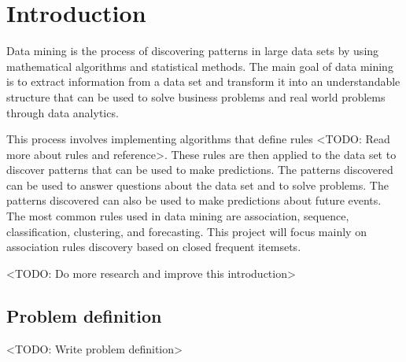 \chapter{Introduction}
\label{chap:thesis-introduction}

Data mining is the process of discovering patterns in large data sets by using mathematical algorithms and statistical methods. The main goal of data mining is to extract information from a data set and transform it into an understandable structure that can be used to solve business problems and real world problems through data analytics.

This process involves implementing algorithms that define rules <TODO: Read more about rules and reference>. These rules are then applied to the data set to discover patterns that can be used to make predictions. The patterns discovered can be used to answer questions about the data set and to solve problems. The patterns discovered can also be used to make predictions about future events. The most common rules used in data mining are association, sequence, classification, clustering, and forecasting. This project will focus mainly on association rules discovery based on closed frequent itemsets.

<TODO: Do more research and improve this introduction>

\section{Problem definition}
\label{sec:problem-definition}

<TODO: Write problem definition>

